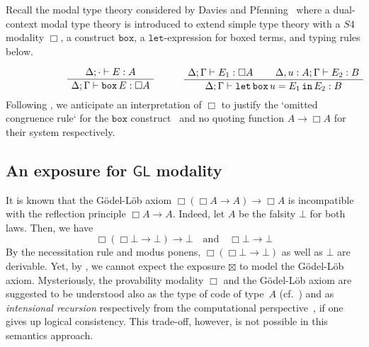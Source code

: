 \documentclass[a4paper,UKenglish,numberwithinsect,cleveref,thm-restate]{lipics-v2021}
\theoremstyle{plain}
\begin{document}
\begin{remark}\label{remark:S4-modality}
Recall the modal type theory considered by Davies and Pfenning~\cite{Davies2001b} where a dual-context modal type theory is introduced to extend simple type theory with a $S4$ modality $\Box$, a construct $\mathtt{box}$, a $\mathtt{let}$-expression for boxed terms, and typing rules below.
\[
\begin{minipage}{.45\linewidth}
  \begin{prooftree}
    \AxiomC{$\Delta; \cdot \vdash E : A$}
    \UnaryInfC{$\Delta; \Gamma \vdash \mathtt{box}\,E:\Box A$}
  \end{prooftree}
\end{minipage}%
\begin{minipage}{0.45\linewidth}
  \begin{prooftree}
    \AxiomC{$\Delta; \Gamma \vdash E_1 : \Box A$}
    \AxiomC{$\Delta, u : A; \Gamma \vdash E_2 : B$}
  \BinaryInfC{$\Delta; \Gamma \vdash \mathtt{let}\,\mathtt{box}\, u = E_1\, \mathtt{in}\,E_2 : B$}
  \end{prooftree}
\end{minipage}
\]
Following , we anticipate an interpretation of $\Box$ to justify the `omitted congruence rule` for the $\mathtt{box}$ construct~\cite[Section~2.5]{Davies2001b} and no quoting function $A \to \Box A$ for their system respectively.
\end{remark}

\subsection{An exposure for \texorpdfstring{$\mathsf{GL}$}{GL} modality}
It is known that the Gödel-Löb axiom $\Box(\Box A \to A) \to \Box A$ is incompatible with the reflection principle $\Box A \to A$.
Indeed, let $A$ be the falsity $\bot$ for both laws. Then, we have
\[
  \Box(\Box \bot \to \bot) \to \bot
  \quad\text{and}\quad
  \Box \bot \to \bot
\]
By the necessitation rule and modus ponens, $\Box (\Box \bot \to \bot)$ as well as $\bot$ are derivable.
Yet, by , we cannot expect the exposure $\boxtimes$ to model the Gödel-Löb axiom.
Mysteriously, the provability modality $\Box$ and the Gödel-Löb axiom are suggested to be understood also as the type of code of type~$A$ (cf.~) and as \emph{intensional recursion} respectively from the computational perspective~\cite{Kavvos2017b}, if one gives up logical consistency.
This trade-off, however, is not possible in this semantics approach.
\end{document}
